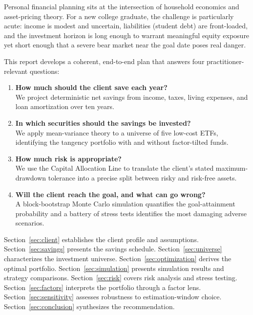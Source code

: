 \documentclass[12pt, letterpaper]{article}
\begin{document}
Personal financial planning sits at the intersection of household economics and
asset-pricing theory.  For a new college graduate, the challenge is particularly
acute: income is modest and uncertain, liabilities (student debt) are front-loaded,
and the investment horizon is long enough to warrant meaningful equity exposure yet
short enough that a severe bear market near the goal date poses real danger.

This report develops a coherent, end-to-end plan that answers four
practitioner-relevant questions:
\begin{enumerate}
  \item \textbf{How much should the client save each year?} \\
        We project deterministic net savings from income, taxes, living expenses,
        and loan amortization over ten years.
  \item \textbf{In which securities should the savings be invested?} \\
        We apply mean-variance theory \citep{markowitz1952} to a universe of
        five low-cost ETFs, identifying the tangency portfolio with and without
        factor-tilted funds.
  \item \textbf{How much risk is appropriate?} \\
        We use the Capital Allocation Line \citep{tobin1958} to translate the
        client's stated maximum-drawdown tolerance into a precise split between
        risky and risk-free assets.
  \item \textbf{Will the client reach the goal, and what can go wrong?} \\
        A block-bootstrap Monte Carlo simulation quantifies the goal-attainment
        probability and a battery of stress tests identifies the most damaging
        adverse scenarios.
\end{enumerate}

Section~\ref{sec:client} establishes the client profile and assumptions.
Section~\ref{sec:savings} presents the savings schedule.
Section~\ref{sec:universe} characterizes the investment universe.
Section~\ref{sec:optimization} derives the optimal portfolio.
Section~\ref{sec:simulation} presents simulation results and strategy comparisons.
Section~\ref{sec:risk} covers risk analysis and stress testing.
Section~\ref{sec:factors} interprets the portfolio through a factor lens.
Section~\ref{sec:sensitivity} assesses robustness to estimation-window choice.
Section~\ref{sec:conclusion} synthesizes the recommendation.
\end{document}
